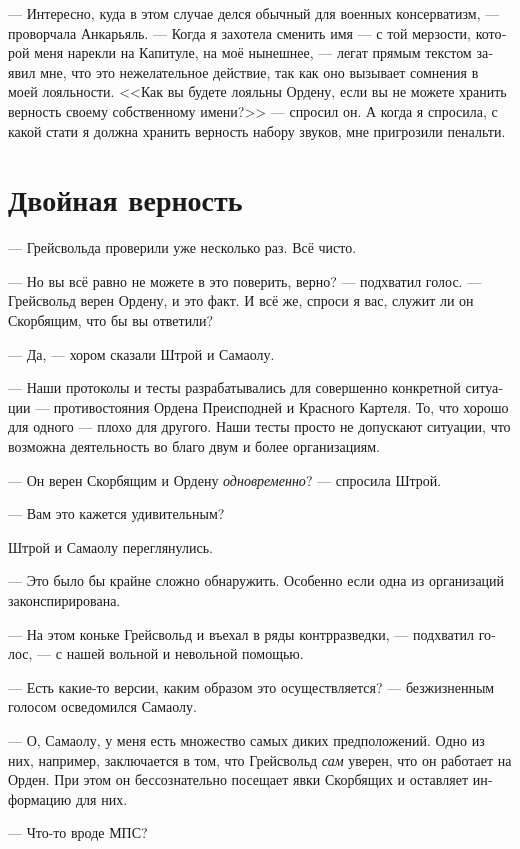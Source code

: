 \documentclass[a4paper,12pt,fleqn]{book}\usepackage{cooltooltips}\usepackage{polyglossia}\setdefaultlanguage[babelshorthands=true]{russian}\setotherlanguage{english}\defaultfontfeatures{Ligatures=TeX,Mapping=tex-text} \usepackage{xcolor}\definecolor{lightgray}{HTML}{bbbbbb}\color{lightgray}\newcommand{\ml}[3]{\textenglish{\textcolor{black}{#3}}}
\newcommand{\FM}{\footnotemark}
\newcommand{\FA}[1]{\footnotetext{#1 \emph{\ml{$0$}{---~Прим.~авт.}{---~Author.}}}}
\begin{document}
{--- Интересно, куда в этом случае делся обычный для военных консерватизм, --- проворчала Анкарьяль.
--- Когда я захотела сменить имя --- с той мерзости, которой меня нарекли на Капитуле, на моё нынешнее, --- легат прямым текстом заявил мне, что это нежелательное действие, так как оно вызывает сомнения в моей лояльности.
<<Как вы будете лояльны Ордену, если вы не можете хранить верность своему собственному имени?>> --- спросил он.
А когда я спросила, с какой стати я должна хранить верность набору звуков, мне пригрозили пенальти.

\section{Двойная верность}

--- Грейсвольда проверили уже несколько раз.
Всё чисто.

--- Но вы всё равно не можете в это поверить, верно? --- подхватил голос.
--- Грейсвольд верен Ордену, и это факт.
И всё же, спроси я вас, служит ли он Скорбящим, что бы вы ответили?

--- Да, --- хором сказали Штрой и Самаолу.

--- Наши протоколы и тесты разрабатывались для совершенно конкретной ситуации --- противостояния Ордена Преисподней и Красного Картеля.
То, что хорошо для одного --- плохо для другого.
Наши тесты просто не допускают ситуации, что возможна деятельность во благо двум и более организациям.

--- Он верен Скорбящим и Ордену \emph{одновременно}? --- спросила Штрой.

--- Вам это кажется удивительным?

Штрой и Самаолу переглянулись.

--- Это было бы крайне сложно обнаружить.
Особенно если одна из организаций законспирирована.

--- На этом коньке Грейсвольд и въехал в ряды контрразведки, --- подхватил голос, --- с нашей вольной и невольной помощью.

--- Есть какие-то версии, каким образом это осуществляется? --- безжизненным голосом осведомился Самаолу.

--- О, Самаолу, у меня есть множество самых диких предположений.
Одно из них, например, заключается в том, что Грейсвольд \emph{сам} уверен, что он работает на Орден.
При этом он бессознательно посещает явки Скорбящих и оставляет информацию для них.

--- Что-то вроде МПС\FM?
\FA{
Маркерные поведенческие стереотипы.
}

}
\end{document}
